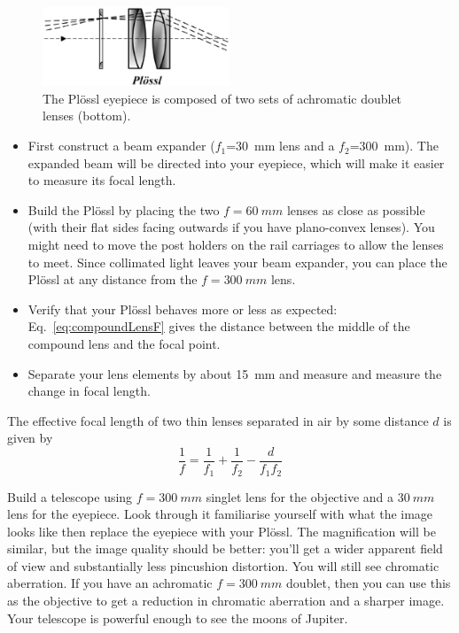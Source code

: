 \documentclass[a4paper]{report}
\begin{document}
\begin{figure}[h]
\center
\includegraphics[width=2.2in]{Plossl.eps}
\caption{The Pl\"{o}ssl eyepiece is composed of two sets of achromatic doublet lenses (bottom).}
\label{fig:composite}
\end{figure}
\begin{itemize}
\item First construct a beam expander ($f_1$=30~mm lens and a $f_2$=300~mm). 
The expanded beam will be directed into your eyepiece, which will make it easier to measure its focal length.
\item Build the Pl\"ossl by placing the two $f=60~mm$ lenses as close as possible (with their flat sides facing outwards if you have plano-convex lenses). 
You might need to move the post holders on the rail carriages to allow the lenses to meet.
Since collimated light leaves your beam expander, you can place the Pl\"ossl at any distance from the $f=300~mm$ lens. 
\item Verify that your Pl\"{o}ssl behaves more or less as expected: 
Eq.~\ref{eq:compoundLensF} gives the distance between the middle of the compound lens and the focal point. 
\item Separate your lens elements by about 15~mm and measure and measure the change in focal length.
\end{itemize}

The effective focal length of two thin lenses separated in air by some distance $d$ is given by
\begin{equation}
\frac{1}{f} = \frac{1}{f_1} + \frac{1}{f_2} - \frac{d}{f_1f_2}
\label{eq:compoundLensF}
\end{equation}


Build a telescope using $f=300~mm$ singlet lens for the objective and a $30~mm$ lens for the eyepiece. 
Look through it familiarise yourself with what the image looks like then replace the eyepiece with your Pl\"{o}ssl. 
The magnification will be similar, but the image quality should be better: you'll get a wider apparent field of view and substantially less pincushion distortion. 
You will still see chromatic aberration. 
If you have an achromatic $f=300~mm$ doublet, then you can use this as the objective to get a reduction in chromatic aberration and a sharper image. 
Your telescope is powerful enough to see the moons of Jupiter. 
\end{document}
